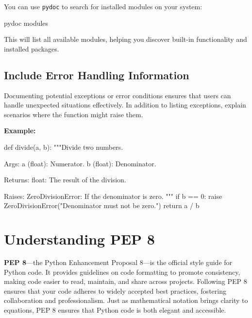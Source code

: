 \documentclass[
  letterpaper,
  DIV=11,
  numbers=noendperiod]{scrreprt}
\newenvironment{Shaded}{\begin{snugshade}}{\end{snugshade}}
\newcommand{\CommentTok}[1]{\textcolor[rgb]{0.37,0.37,0.37}{#1}}
\newcommand{\ControlFlowTok}[1]{\textcolor[rgb]{0.00,0.23,0.31}{#1}}
\newcommand{\DecValTok}[1]{\textcolor[rgb]{0.68,0.00,0.00}{#1}}
\newcommand{\ExtensionTok}[1]{\textcolor[rgb]{0.00,0.23,0.31}{#1}}
\newcommand{\KeywordTok}[1]{\textcolor[rgb]{0.00,0.23,0.31}{#1}}
\newcommand{\NormalTok}[1]{\textcolor[rgb]{0.00,0.23,0.31}{#1}}
\newcommand{\OperatorTok}[1]{\textcolor[rgb]{0.37,0.37,0.37}{#1}}
\newcommand{\PreprocessorTok}[1]{\textcolor[rgb]{0.68,0.00,0.00}{#1}}
\newcommand{\StringTok}[1]{\textcolor[rgb]{0.13,0.47,0.30}{#1}}
\begin{document}
You can use \texttt{pydoc} to search for installed modules on your
system:

\begin{Shaded}
\begin{Highlighting}[]
\ExtensionTok{pydoc}\NormalTok{ modules}
\end{Highlighting}
\end{Shaded}

This will list all available modules, helping you discover built-in
functionality and installed packages.

\hypertarget{include-error-handling-information}{%
\subsection{Include Error Handling
Information}\label{include-error-handling-information}}

Documenting potential exceptions or error conditions ensures that users
can handle unexpected situations effectively. In addition to listing
exceptions, explain scenarios where the function might raise them.

\textbf{Example:}

\begin{Shaded}
\begin{Highlighting}[]
\KeywordTok{def}\NormalTok{ divide(a, b):}
    \CommentTok{"""Divide two numbers.}

\CommentTok{    Args:}
\CommentTok{        a (float): Numerator.}
\CommentTok{        b (float): Denominator.}

\CommentTok{    Returns:}
\CommentTok{        float: The result of the division.}

\CommentTok{    Raises:}
\CommentTok{        ZeroDivisionError: If the denominator is zero.}
\CommentTok{    """}
    \ControlFlowTok{if}\NormalTok{ b }\OperatorTok{==} \DecValTok{0}\NormalTok{:}
        \ControlFlowTok{raise} \PreprocessorTok{ZeroDivisionError}\NormalTok{(}\StringTok{"Denominator must not be zero."}\NormalTok{)}
    \ControlFlowTok{return}\NormalTok{ a }\OperatorTok{/}\NormalTok{ b}
\end{Highlighting}
\end{Shaded}

\hypertarget{understanding-pep-8}{%
\section{Understanding PEP 8}\label{understanding-pep-8}}

\textbf{PEP 8}---the Python Enhancement Proposal 8---is the official
style guide for Python code. It provides guidelines on code formatting
to promote consistency, making code easier to read, maintain, and share
across projects. Following PEP 8 ensures that your code adheres to
widely accepted best practices, fostering collaboration and
professionalism. Just as mathematical notation brings clarity to
equations, PEP 8 ensures that Python code is both elegant and
accessible.
\end{document}
